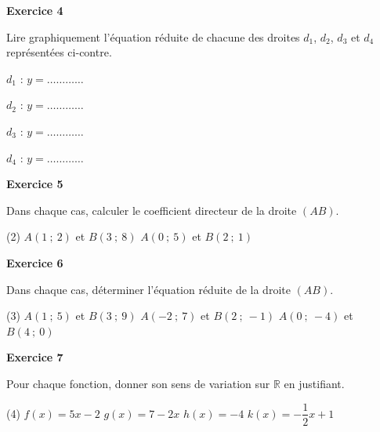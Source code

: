 \documentclass[a4paper,11pt]{article}
\newenvironment{exercice}[1]{%
  \Needspace{6\baselineskip}\par\bigskip\noindent\textbf{Exercice #1}\par\smallskip\noindent\ignorespaces
}{%
  \par
}
\newcommand{\repere}[4]{%
  \draw[very thin, gray!40] (#1,#3) grid (#2,#4);
  \draw[->] (#1,0) -- ({#2+0.4},0) node[below right] {\small $x$};
  \draw[->] (0,#3) -- (0,{#4+0.4}) node[above left] {\small $y$};
  \foreach \x in {#1,...,#2} {\ifnum\x=0\else\draw (\x,0.08) -- (\x,-0.08) node[below] {\scriptsize $\x$};\fi}
  \foreach \y in {#3,...,#4} {\ifnum\y=0\else\draw (0.08,\y) -- (-0.08,\y) node[left] {\scriptsize $\y$};\fi}
  \node[below left] at (0,0) {\scriptsize $0$};
}
\begin{document}
\begin{exercice}{4}
\begin{minipage}[c]{0.5\linewidth}
Lire graphiquement l'équation réduite de chacune des droites $d_1$, $d_2$, $d_3$ et $d_4$ représentées ci-contre.

\bigskip
$d_1$ : $y=\dots\dots\dots\dots$

\bigskip
$d_2$ : $y=\dots\dots\dots\dots$

\bigskip
$d_3$ : $y=\dots\dots\dots\dots$

\bigskip
$d_4$ : $y=\dots\dots\dots\dots$
\end{minipage}
\hfill
\begin{minipage}[c]{0.46\linewidth}
\centering
{}
\end{minipage}
\end{exercice}

\begin{exercice}{5}
Dans chaque cas, calculer le coefficient directeur de la droite $(AB)$.
\begin{tasks}(2)
\task $A(1~;~2)$ et $B(3~;~8)$
\task $A(0~;~5)$ et $B(2~;~1)$
\end{tasks}
\end{exercice}

\begin{exercice}{6}
Dans chaque cas, déterminer l'équation réduite de la droite $(AB)$.
\begin{tasks}(3)
\task $A(1~;~5)$ et $B(3~;~9)$
\task $A(-2~;~7)$ et $B(2~;~-1)$
\task $A(0~;~-4)$ et $B(4~;~0)$
\end{tasks}
\end{exercice}

\begin{exercice}{7}
Pour chaque fonction, donner son sens de variation sur $\mathbb{R}$ en justifiant.
\begin{tasks}(4)
\task $f(x)=5x-2$
\task $g(x)=7-2x$
\task $h(x)=-4$
\task $k(x)=-\dfrac{1}{2}x+1$
\end{tasks}
\end{exercice}
\end{document}
